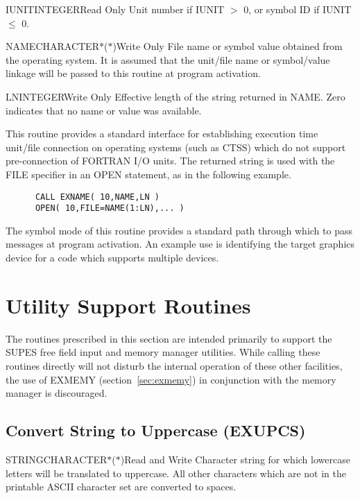 
\begin{argy}{IUNIT}{INTEGER}{Read Only}
Unit number if IUNIT $>$ 0, or symbol ID if IUNIT $\leq$ 0.
\end{argy}

\begin{argy}{NAME}{CHARACTER$*$($*$)}{Write Only}
File name or symbol value obtained from the operating system. It is assumed
that the unit/file name or symbol/value linkage will be passed to this
routine at program activation.
\end{argy}

\begin{argy}{LN}{INTEGER}{Write Only}
Effective length of the string returned in NAME.  Zero indicates that no
name or value was available.
\end{argy}

This routine provides a standard interface for establishing execution time
unit/file connection on operating systems (such as CTSS) which do not
support pre-connection of FORTRAN I/O units.  The returned string is used
with the FILE specifier in an OPEN statement, as in the following example.
\begin{verbatim}
      CALL EXNAME( 10,NAME,LN )
      OPEN( 10,FILE=NAME(1:LN),... )
\end{verbatim}
The symbol mode of this routine provides a standard path through which to
pass messages at program activation.  An example use is identifying the
target graphics device for a code which supports multiple devices.

\section{Utility Support Routines}
The routines prescribed in this section are intended primarily to support
the SUPES free field input and memory manager utilities.  While calling
these routines directly will not disturb the internal operation of these
other facilities, the use of EXMEMY (section~\ref{sec:exmemy}) in
conjunction with the memory manager is discouraged.

\subsection{Convert String to Uppercase (EXUPCS)} \label{sec:exupcs}


\begin{argy}{STRING}{CHARACTER$*$($*$)}{Read and Write}
Character string for which lowercase letters will be translated to
uppercase.  All other characters which are not in the printable ASCII character
set are converted to spaces.
\end{argy}

